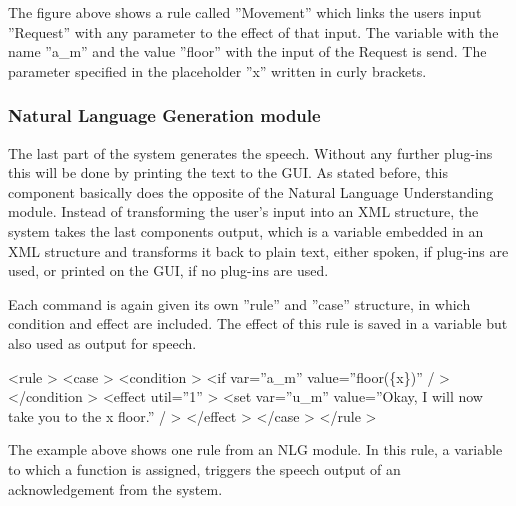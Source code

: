 \documentclass[a4paper, 12pt]{article}
\begin{document}
The figure above shows  a rule called ”Movement” which links the users input ”Request” with any parameter to the effect of that input.
The variable with the name ”a\_m” and the value ”floor” with the input of the Request is send.
The parameter specified in the placeholder ”x” written in curly brackets.
\subsubsection{Natural Language Generation module}
The last part of the system generates the speech. 
Without any further plug-ins this will be done by printing the text to the GUI.
As stated before, this component basically does the opposite of the Natural Language Understanding module. 
Instead of transforming the user's input into an XML structure, the system takes the last components output, which is a variable embedded in an XML structure and transforms it back to plain text, either spoken, if plug-ins are used, or printed on the GUI, if no plug-ins are used. \newline

Each command is again given its own ”rule” and ”case” structure, in which condition and effect are included. 
The effect of this rule is saved in a variable but also used as output for speech. \newline

\textless rule \textgreater \newline
\indent \indent \textless case \textgreater \newline
\indent \indent \indent \textless condition \textgreater \newline 
\indent \indent \indent \indent \textless if var=”a\_m” value=”floor(\{x\})” / \textgreater \newline
\indent \indent \indent \textless /condition \textgreater \newline
\indent \indent \indent \textless effect util=”1” \textgreater \newline 
\indent \indent \indent \indent \textless set var=”u\_m” value=”Okay, I will now take you to the {x} floor.” / \textgreater \newline
\indent \indent \indent \textless /effect \textgreater \newline
\indent \indent\textless /case \textgreater \newline
\indent \textless /rule \textgreater \newline

The example above shows one rule from an NLG module. 
In this rule, a variable to which a function  is assigned, triggers the speech output of an acknowledgement from the system.
        
\end{document}
